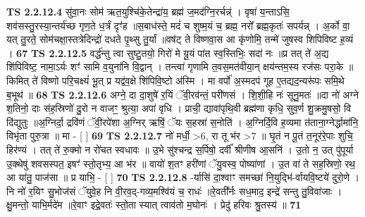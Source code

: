 \documentclass[17pt]{extarticle}
\begin{document}
                  \newline
                                \textbf{ TS 2.2.12.4} \newline
                  सु॑वा॒नः सोम॑ ऋत॒युश्चि॑के॒तेन्द्रा॑य॒ ब्रह्म॑ ज॒मद॑ग्नि॒रर्चन्न्॑ । वृषा॑ य॒न्ताऽसि॒ शव॑सस्तु॒रस्या॒न्तर्य॑च्छ गृण॒ते ध॒र्त्रं दृꣳ॑ह ॥स॒बाध॑स्ते॒ मदं॑ च शुष्म॒यं च॒ ब्रह्म॒ नरो᳚ ब्रह्म॒कृतः॑ सपर्यन्न् । अ॒र्को वा॒ यत् तु॒रते॒ सोम॑चक्षा॒स्तत्रेदिन्द्रो॑ दधते पृ॒थ्सु तु॒र्यां ॥वष॑ट् ते विष्णवा॒स आ कृ॑णोमि॒ तन्मे॑ जुषस्व शिपिविष्ट ह॒व्यं । \textbf{  67} \newline
                  \newline
                                \textbf{ TS 2.2.12.5} \newline
                  वर्द्ध॑न्तु त्वा सुष्टु॒तयो॒ गिरो॑ मे यू॒यं पा॑त स्व॒स्तिभिः॒ सदा॑ नः ॥प्र तत् ते॑ अ॒द्य शि॑पिविष्ट॒ नामा॒ऽर्यः शꣳ॑ सामि व॒युना॑नि वि॒द्वान् । तन्त्वा॑ गृणामि त॒वस॒मत॑वीया॒न् क्षय॑न्तम॒स्य रज॑सः परा॒के ॥किमित् ते॑ विष्णो परि॒चक्ष्यं॑ भू॒त् प्र यद्व॑व॒क्षे शि॑पिवि॒ष्टो अ॑स्मि । मा वर्पो॑ अ॒स्मदप॑ गूह ए॒तद्यद॒न्यरू॑पः समि॒थे ब॒भूथ॑ ॥ \textbf{  68} \newline
                  \newline
                                \textbf{ TS 2.2.12.6} \newline
                  अग्ने॒ दा दा॒शुषे॑ र॒यिं ॅवी॒रव॑न्तं॒ परी॑णसं । शि॒शी॒हि नः॑ सूनु॒मतः॑ ॥दा नो॑ अग्ने श॒तिनो॒ दाः स॑ह॒स्रिणो॑ दु॒रो न वाजꣳ॒॒ श्रुत्या॒ अपा॑ वृधि । प्राची॒ द्यावा॑पृथि॒वी ब्रह्म॑णा कृधि॒ सुव॒र्ण शु॒क्रमु॒षसो॒ वि दि॑द्युतुः ॥अ॒ग्निर्दा॒ द्रवि॑णं ॅवी॒रपे॑शा अ॒ग्निर् ऋषिं॒ ॅयः स॒हस्रा॑ स॒नोति॑ । अ॒ग्निर्दि॒वि ह॒व्यमा त॑ताना॒ग्नेर्द्धामा॑नि॒ विभृ॑ता पुरु॒त्रा ॥ मा - [  ] \textbf{  69} \newline
                  \newline
                                \textbf{ TS 2.2.12.7} \newline
                  नो॑ मर्धी॒ >6, रा तू भ॑र >7 ॥ घृ॒तं न पू॒तं त॒नूर॑रे॒पाः शुचि॒ हिर॑ण्यं । तत् ते॑ रु॒क्मो न रो॑चत स्वधावः ॥  उ॒भे सु॑श्चन्द्र स॒र्पिषो॒ दर्वी᳚ श्रीणीष आ॒सनि॑ । उ॒तो न॒ उत् पु॑पूर्या उ॒क्थेषु॑ शवसस्पत॒ इषꣳ॑ स्तो॒तृभ्य॒ आ भ॑र ॥ वायो॑ श॒तꣳ हरी॑णां ॅयु॒वस्व॒ पोष्या॑णां । उ॒त वा॑ ते सह॒स्रिणो॒ रथ॒ आ या॑तु॒ पाज॑सा ॥ प्र याभि॒ - [  ] \textbf{  70} \newline
                  \newline
                                \textbf{ TS 2.2.12.8} \newline
                  -र्यासि॑ दा॒श्वाꣳ समच्छा॑ नि॒युद्भि॑-र्वायवि॒ष्टये॑ दुरो॒णे । नि नो॑ र॒यिꣳ सु॒भोज॑सं ॅयुवे॒ह नि वी॒रव॒द्-गव्य॒मश्वि॑यं च॒ राधः॑ ॥रे॒वती᳚र्नः सध॒माद॒ इन्द्रे॑ सन्तु तु॒विवा॑जाः । क्षु॒मन्तो॒ याभि॒र्मदे॑म ॥रे॒वाꣳ इद्रे॒वतः॑ स्तो॒ता स्यात् त्वाव॑तो म॒घोनः॑ । प्रेदु॑ हरिवः श्रु॒तस्य॑ ॥ \textbf{  71} \newline
\end{document}
